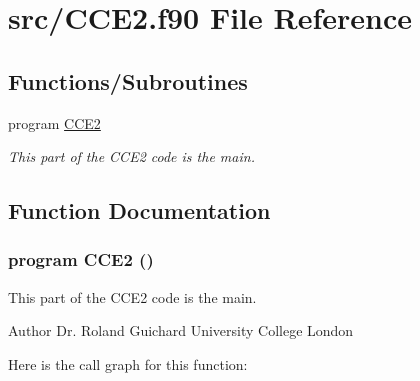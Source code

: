 \hypertarget{CCE2_8f90}{
\section{src/CCE2.f90 File Reference}
\label{CCE2_8f90}
}
\subsection*{Functions/Subroutines}
\begin{DoxyCompactItemize}
\item 
program \hyperlink{CCE2_8f90_a62a21e1357c05203f9f851a59bdf0b00}{CCE2}
\begin{DoxyCompactList}\small\item\em This part of the CCE2 code is the main. \item\end{DoxyCompactList}\end{DoxyCompactItemize}


\subsection{Function Documentation}
\hypertarget{CCE2_8f90_a62a21e1357c05203f9f851a59bdf0b00}{
\subsubsection[{CCE2}]{\setlength{\rightskip}{0pt plus 5cm}program CCE2 ()}}
\label{CCE2_8f90_a62a21e1357c05203f9f851a59bdf0b00}


This part of the CCE2 code is the main. \begin{DoxyAuthor}{Author}
Dr. Roland Guichard University College London 
\end{DoxyAuthor}


Here is the call graph for this function: